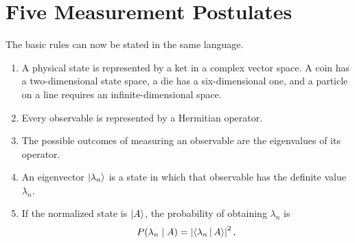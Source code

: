\begin{classroomqa}
\end{classroomqa}

\begin{classroomqa}
\end{classroomqa}

\section{Five Measurement Postulates}

The basic rules can now be stated in the same language.

\begin{enumerate}
  \item A physical state is represented by a ket in a complex vector space.
  A coin has a two-dimensional state space, a die has a six-dimensional one,
  and a particle on a line requires an infinite-dimensional space.

  \item Every observable is represented by a Hermitian operator.

  \item The possible outcomes of measuring an observable are the eigenvalues
  of its operator.

  \item An eigenvector \(\left\lvert\lambda_n\right\rangle\) is a state in which that observable
  has the definite value \(\lambda_n\).

  \item If the normalized state is \(\left\lvert A\right\rangle\), the probability of obtaining
  \(\lambda_n\) is
  \begin{equation}
    P(\lambda_n\mid A)
    =\left|\left\langle\lambda_n\,\middle|\,A\right\rangle\right|^2.
    \label{eq:born-discrete}
  \end{equation}
\end{enumerate}

